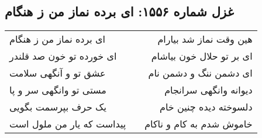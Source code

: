 \begin{center}
\section*{غزل شماره ۱۵۵۶: ای برده نماز من ز هنگام}
\label{sec:1556}
\begin{longtable}{l p{0.5cm} r}
ای برده نماز من ز هنگام
&&
هین وقت نماز شد بیارام
\\
ای خورده تو خون صد قلندر
&&
ای بر تو حلال خون بیاشام
\\
عشق تو و آنگهی سلامت
&&
ای دشمن ننگ و دشمن نام
\\
مستی تو وانگهی سر و پا
&&
دیوانه وانگهی سرانجام
\\
یک حرف بپرسمت بگویی
&&
دلسوخته دیده چنین خام
\\
پیداست که یار من ملول است
&&
خاموش شدم به کام و ناکام
\\
\end{longtable}
\end{center}
